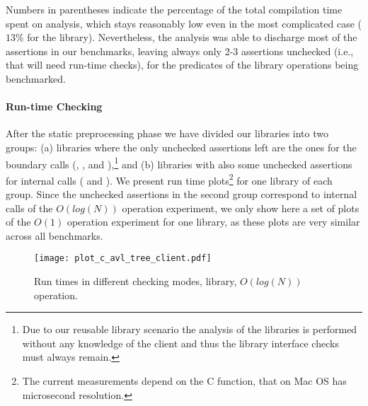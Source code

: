\documentclass{llncs}
\newcommand{\finalcompression}[1]{\vspace*{#1}}
\begin{document}
%
\noindent
Numbers in parentheses indicate the percentage of the total
compilation time spent on analysis, which stays reasonably low even in
the most complicated case ($13\%$ for the  library).
%
Nevertheless, the analysis was able to discharge most of the
assertions in our benchmarks, leaving always only 2-3 assertions
unchecked (i.e., that will need run-time checks), for the predicates
of the library operations being benchmarked.

\paragraph{Run-time Checking}
%
After the static preprocessing phase we have divided our libraries
into two groups:
%
(a) libraries where the only unchecked assertions left are the ones for
the boundary calls (, , and ),\footnote{%
Due to our reusable library scenario the
analysis of the libraries is performed without any knowledge of the
client and thus the library interface checks must always remain.}
%
and %
(b) libraries with also some unchecked assertions for internal
calls ( and ).
%
We present run time plots\footnote{The current measurements depend on
  the C  function, that on Mac OS has microsecond
  resolution.} %
for one library of each group.
%
Since the unchecked assertions in the second group correspond to
internal calls of the $O(log(N))$ operation experiment, we only show
here a set of plots of the $O(1)$ operation experiment for one library,
as these plots are very similar across all benchmarks.


\newcommand{\plotwidth}{0.8\textwidth}

\begin{figure}[t]
  \centering
    \texttt{[image: plot\_c\_avl\_tree\_client.pdf]}
    \finalcompression{-3mm}
  \caption{Run times in different checking modes,
           library, $O(log(N))$ operation.} %
  \label{fig:plot_b_avl}

\end{figure}
\end{document}
